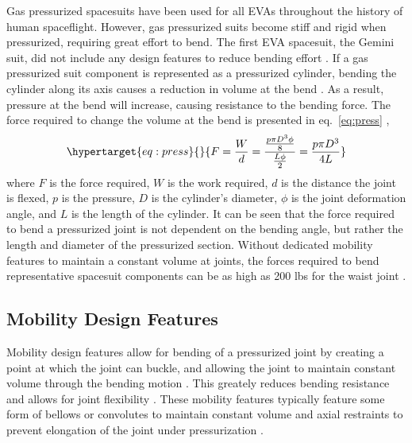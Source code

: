 \documentclass[defaultstyle,11pt]{comps}
\begin{document}
Gas pressurized spacesuits have been used for all EVAs throughout the history of human spaceflight.
However, gas pressurized suits become stiff and rigid when pressurized, requiring great effort to bend.
The first EVA spacesuit, the Gemini suit, did not include any design features to reduce bending effort \citep{Thomas2012}.
If a gas pressurized suit component is represented as a pressurized cylinder, bending the cylinder along its axis causes a reduction in volume at the bend \citep{Harris2001}.
As a result, pressure at the bend will increase, causing resistance to the bending force.
The force required to change the volume at the bend is presented in eq.~\ref{eq:press} \citep{Newman1997, Harris2001},
\begin{equation}\protect\hypertarget{eq:press}{}{
F = \frac{W}{d} = \frac{\frac{p\pi D^{3}\phi}{8}}{\frac{L\phi}{2}} = \frac{p\pi D^{3}}{4L}
}\label{eq:press}\end{equation}
where \(F\) is the force required, \(W\) is the work required, \(d\) is the distance the joint is flexed, \(p\) is the pressure, \(D\) is the cylinder's diameter, \(\phi\) is the joint deformation angle, and \(L\) is the length of the cylinder.
It can be seen that the force required to bend a pressurized joint is not dependent on the bending angle, but rather the length and diameter of the pressurized section.
Without dedicated mobility features to maintain a constant volume at joints, the forces required to bend representative spacesuit components can be as high as 200 lbs for the waist joint \citep{Newman1997}.

\hypertarget{mobility-design-features}{%
\subsection{Mobility Design Features}\label{mobility-design-features}}

Mobility design features allow for bending of a pressurized joint by creating a point at which the joint can buckle, and allowing the joint to maintain constant volume through the bending motion \citep{Harris2001}.
This greately reduces bending resistance and allows for joint flexibility \citep{Harris2001}.
These mobility features typically feature some form of bellows or convolutes to maintain constant volume and axial restraints to prevent elongation of the joint under pressurization \citep{Harris2001}.
\end{document}
